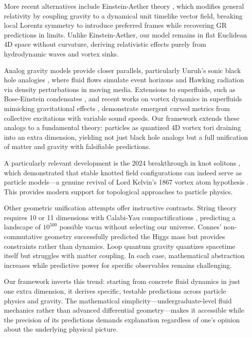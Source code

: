 More recent alternatives include Einstein-Aether theory \cite{jacobson2004einstein}, which modifies general relativity by coupling gravity to a dynamical unit timelike vector field, breaking local Lorentz symmetry to introduce preferred frames while recovering GR predictions in limits. Unlike Einstein-Aether, our model remains in flat Euclidean 4D space without curvature, deriving relativistic effects purely from hydrodynamic waves and vortex sinks.

Analog gravity models provide closer parallels, particularly Unruh's sonic black hole analogies \cite{unruh1981experimental}, where fluid flows simulate event horizons and Hawking radiation via density perturbations in moving media. Extensions to superfluids, such as Bose-Einstein condensates \cite{steinhauer2016hawking}, and recent works on vortex dynamics in superfluids mimicking gravitational effects \cite{svancara2024rotating}, demonstrate emergent curved metrics from collective excitations with variable sound speeds. Our framework extends these analogs to a fundamental theory: particles as quantized 4D vortex tori draining into an extra dimension, yielding not just black hole analogs but a full unification of matter and gravity with falsifiable predictions.

A particularly relevant development is the 2024 breakthrough in knot solitons \cite{eto2024knots}, which demonstrated that stable knotted field configurations can indeed serve as particle models---a genuine revival of Lord Kelvin's 1867 vortex atom hypothesis \cite{thomson1867vortex}. This provides modern support for topological approaches to particle physics.

Other geometric unification attempts offer instructive contrasts. String theory requires 10 or 11 dimensions with Calabi-Yau compactifications \cite{candelas1985vacuum}, predicting a landscape of $10^{500}$ possible vacua without selecting our universe. Connes' non-commutative geometry \cite{chamseddine2007gravity} successfully predicted the Higgs mass but provides constraints rather than dynamics. Loop quantum gravity \cite{ashtekar1986new} quantizes spacetime itself but struggles with matter coupling. In each case, mathematical abstraction increases while predictive power for specific observables remains challenging.

Our framework inverts this trend: starting from concrete fluid dynamics in just one extra dimension, it derives specific, testable predictions across particle physics and gravity. The mathematical simplicity---undergraduate-level fluid mechanics rather than advanced differential geometry---makes it accessible while the precision of its predictions demands explanation regardless of one's opinion about the underlying physical picture.

